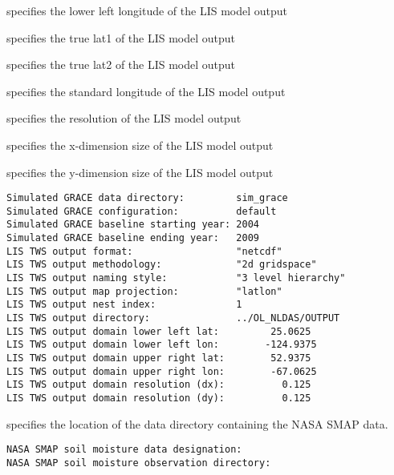  specifies the lower left longitude of the LIS model output

 specifies the true lat1 of the LIS model output

 specifies the true lat2 of the LIS model output

 specifies the standard longitude of the LIS model output

 specifies the resolution of the LIS model output

 specifies the x-dimension size of the LIS model output

 specifies the y-dimension size of the LIS model output

 

 \begin{Verbatim}[frame=single]
Simulated GRACE data directory:         sim_grace
Simulated GRACE configuration:          default
Simulated GRACE baseline starting year: 2004
Simulated GRACE baseline ending year:   2009
LIS TWS output format:                  "netcdf"
LIS TWS output methodology:             "2d gridspace"
LIS TWS output naming style:            "3 level hierarchy"
LIS TWS output map projection:          "latlon"
LIS TWS output nest index:              1
LIS TWS output directory:               ../OL_NLDAS/OUTPUT
LIS TWS output domain lower left lat:         25.0625
LIS TWS output domain lower left lon:        -124.9375
LIS TWS output domain upper right lat:        52.9375
LIS TWS output domain upper right lon:        -67.0625
LIS TWS output domain resolution (dx):          0.125
LIS TWS output domain resolution (dy):          0.125
 \end{Verbatim}

 
  

 specifies the location of the data directory containing the NASA 
 SMAP data.

 

 \begin{Verbatim}[frame=single]
NASA SMAP soil moisture data designation:
NASA SMAP soil moisture observation directory:
 \end{Verbatim}

